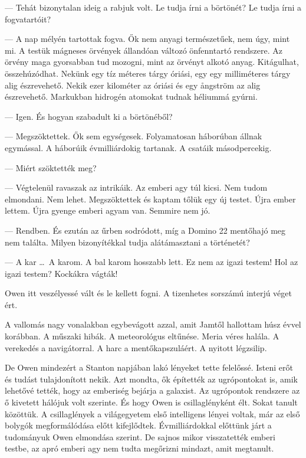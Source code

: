 \documentclass[10pt]{memoir}
\begin{document}
--- Tehát bizonytalan ideig a rabjuk volt. Le tudja írni a börtönét? Le tudja
írni a fogvatartóit?

--- A nap mélyén tartottak fogva. Ők nem anyagi természetűek, nem úgy, mint mi.
A testük mágneses örvények állandóan változó önfenntartó rendszere. Az örvény
maga gyorsabban tud mozogni, mint az örvényt alkotó anyag. Kitágulhat,
összehúzódhat. Nekünk egy tíz méteres tárgy óriási, egy egy milliméteres tárgy
alig észrevehető. Nekik ezer kilométer az óriási és egy ångström az alig
észrevehető. Markukban hidrogén atomokat tudnak héliummá gyúrni.

--- Igen. És hogyan szabadult ki a börtönéből?

--- Megszöktettek. Ők sem egységesek. Folyamatosan háborúban állnak egymással.
A háborúik évmilliárdokig tartanak. A csatáik másodpercekig.

--- Miért szöktették meg?

--- Végtelenül ravaszak az intrikáik. Az emberi agy túl kicsi. Nem tudom
elmondani. Nem lehet. Megszöktettek és kaptam tőlük egy új testet. Újra ember
lettem. Újra gyenge emberi agyam van. Semmire nem jó.

--- Rendben. És ezután az űrben sodródott, míg a Domino 22 mentőhajó meg nem
találta. Milyen bizonyítékkal tudja alátámasztani a történetét?

--- A kar \dots\ A karom. A bal karom hosszabb lett. Ez nem az igazi testem!
Hol az igazi testem? Kockákra vágták!

Owen itt veszélyessé vált és le kellett fogni. A tizenhetes sorszámú interjú
véget ért.

A vallomás nagy vonalakban egybevágott azzal, amit Jamtől hallottam húsz évvel
korábban. A műszaki hibák. A meteorológus eltűnése. Meria véres halála. A
verekedés a navigátorral. A harc a mentőkapszuláért. A nyitott légzsilip.

De Owen mindezért a Stanton napjában lakó lényeket tette felelőssé. Isteni erőt
és tudást tulajdonított nekik. Azt mondta, ők építették az ugrópontokat is,
amik lehetővé tették, hogy az emberiség bejárja a galaxist. Az ugrópontok
rendszere az ő kivetett hálójuk volt szerinte. És hogy Owen is csillaglényként
élt. Sokat tanult közöttük. A csillaglények a világegyetem első intelligens
lényei voltak, már az első bolygók megformálódása előtt kifejlődtek.
Évmilliárdokkal előttünk járt a tudományuk Owen elmondása szerint. De sajnos
mikor visszatették emberi testbe, az apró emberi agy nem tudta megőrizni
mindazt, amit megtanult.
\end{document}
